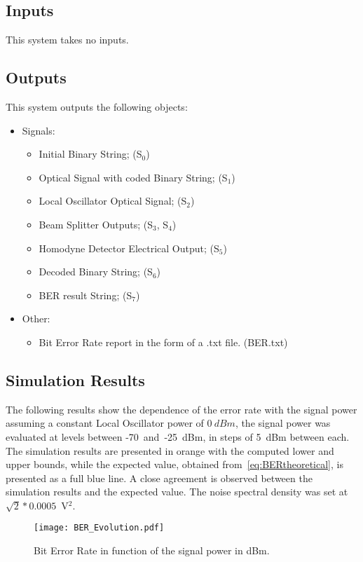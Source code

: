\subsection*{Inputs}

This system takes no inputs.

\subsection*{Outputs}

This system outputs the following objects:
\begin{itemize}
\item Signals:
\begin{itemize}
\item Initial Binary String; (S$_0$)
\item Optical Signal with coded Binary String; (S$_{1}$)
\item Local Oscillator Optical Signal; (S$_{2}$)
\item Beam Splitter Outputs; (S$_{3}$, S$_{4}$)
\item Homodyne Detector Electrical Output; (S$_{5}$)
\item Decoded Binary String; (S$_{6}$)
\item BER result String; (S$_{7}$)
\end{itemize}
\item Other:
\begin{itemize}
\item Bit Error Rate report in the form of a .txt file. (BER.txt)
\end{itemize}
\end{itemize}

\subsection*{Simulation Results}

The following results show the dependence of the error rate with the signal power assuming a constant Local Oscillator power of $0~dBm$, the signal power was evaluated at levels between -70~and~-25~dBm, in steps of 5~dBm between each. The simulation results are presented in orange with the computed lower and upper bounds, while the expected value, obtained from~\eqref{eq:BERtheoretical}, is presented as a full blue line. A close agreement is observed between the simulation results and the expected value. The noise spectral density was set at $\sqrt{2}*0.0005$~V$^2$. 
\begin{figure}[H]
\centering
\texttt{[image: BER\_Evolution.pdf]}
\caption{Bit Error Rate in function of the signal power in dBm.}
\label{fig:berevolution}
\end{figure}
